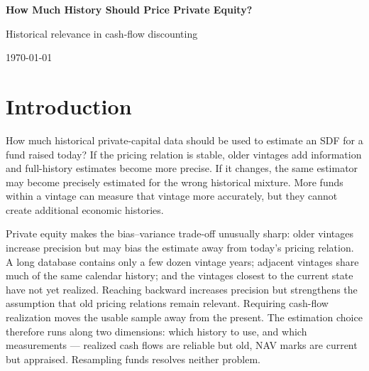 \documentclass[11pt]{article}
\newcommand{\tbd}[1]{\textbf{[TBD: #1]}}
\begin{document}
{\Large\bfseries How Much History Should Price Private Equity?\par}
{\normalsize Historical relevance in cash-flow discounting\par}
\today

\begin{abstract}
How much historical data should be used to price a newly raised private-equity
fund? Older vintages increase precision but may reflect different financing,
valuation, and exit conditions, while recent vintages remain partly
unrealized. We estimate the same cash-flow discounting model using expanding,
time-decayed, and state-weighted historical samples. In a
vintage-at-formation backtest, each estimator uses only information available
when the target vintage is raised and is evaluated once, after that vintage
matures, on its cash-flow NPV error. We also test whether NAV-based moments
from still-active funds add to, or can replace, realized-cash-flow
information. All choices are judged on the same later cash-flow target. \tbd{State the headline
result in NPV cents per dollar of commitment.} The analysis treats historical
relevance, rather than the number of resampled funds, as the scarce empirical
object.
\end{abstract}

\section{Introduction}

How much historical private-capital data should be used to estimate an SDF
for a fund raised today? If the pricing relation is stable, older vintages add
information and full-history estimates become more precise. If it changes,
the same estimator may become precisely estimated for the wrong historical
mixture. More funds within a vintage can measure that vintage more accurately,
but they cannot create additional economic histories.

Private equity makes the bias--variance trade-off unusually sharp: older
vintages increase precision but may bias the estimate away from today's
pricing relation. A long database contains only a few dozen vintage years;
adjacent vintages share much
of the same calendar history; and the vintages closest to the current state
have not yet realized. Reaching backward increases precision but strengthens
the assumption that old pricing relations remain relevant. Requiring cash-flow
realization moves the usable sample away from the present. The estimation
choice therefore runs along two dimensions: which history to use, and which
measurements --- realized cash flows are reliable but old, NAV marks are
current but appraised. Resampling funds resolves neither problem.
\end{document}
